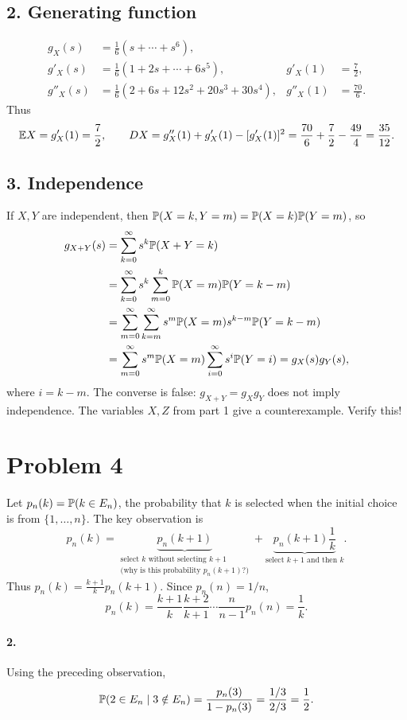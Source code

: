 \documentclass[11pt,a4paper]{article}
\begin{document}
\subsection*{2. Generating function}
\begin{align*}
g_X(s)&=\tfrac16(s+\cdots+s^6),\\
g'_X(s)&=\tfrac16(1+2s+\cdots+6s^5),&g'_X(1)&=\tfrac72,\\
g''_X(s)&=\tfrac16(2+6s+12s^2+20s^3+30s^4),&g''_X(1)&=\tfrac{70}6.
\end{align*}
Thus
\[
\E X=g'_X(1)=\frac72,\qquad
DX=g''_X(1)+g'_X(1)-[g'_X(1)]^2
=\frac{70}6+\frac72-\frac{49}4=\frac{35}{12}.
\]

\subsection*{3. Independence}
If $X,Y$ are independent, then $\P(X=k,Y=m)=\P(X=k)\P(Y=m)$, so
\begin{align*}
g_{X+Y}(s)&=\sum_{k=0}^\infty s^k\P(X+Y=k)\\
&=\sum_{k=0}^\infty s^k\sum_{m=0}^k\P(X=m)\P(Y=k-m)\\
&=\sum_{m=0}^\infty\sum_{k=m}^\infty
s^m\P(X=m)s^{k-m}\P(Y=k-m)\\
&=\sum_{m=0}^\infty s^m\P(X=m)\sum_{i=0}^\infty s^i\P(Y=i)
=g_X(s)g_Y(s),
\end{align*}
where $i=k-m$. The converse is false: $g_{X+Y}=g_Xg_Y$ does not imply independence. The variables $X,Z$ from part 1 give a counterexample. Verify this!

\section*{Problem 4}
Let $p_n(k)=\P(k\in E_n)$, the probability that $k$ is selected when the initial choice is from $\{1,\ldots,n\}$. The key observation is
\[
p_n(k)=\underbrace{p_n(k+1)}_{\substack{\text{select }k\text{ without selecting }k+1\\\text{(why is this probability }p_n(k+1)\text{?)}}}
+\underbrace{p_n(k+1)\frac1k}_{\text{select }k+1\text{ and then }k}.
\]
Thus $p_n(k)=\frac{k+1}{k}p_n(k+1)$. Since $p_n(n)=1/n$,
\[
p_n(k)=\frac{k+1}{k}\frac{k+2}{k+1}\cdots\frac n{n-1}p_n(n)=\frac1k.
\]
\paragraph{2.} Using the preceding observation,
\[
\P(2\in E_n\mid3\notin E_n)=\frac{p_n(3)}{1-p_n(3)}
=\frac{1/3}{2/3}=\frac12.
\]
\end{document}
